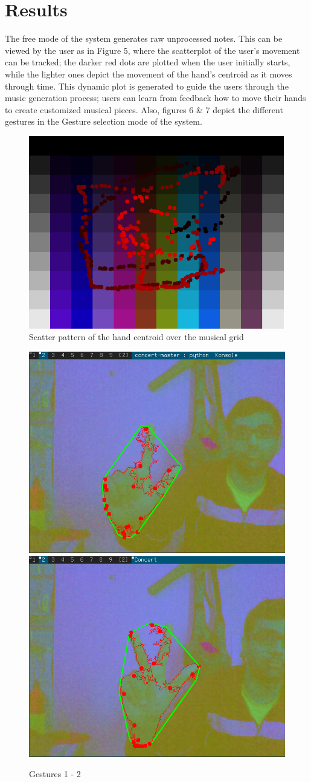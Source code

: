 \documentclass[letterpaper, 10 pt, twoside, conference]{ieeeconf}
\begin{document}
\section{Results}

The free mode of the system generates raw unprocessed notes. This can be viewed by the user as in Figure 5,
where the scatterplot of the user's movement can be tracked; the darker red dots are plotted when the
user initially starts, while the lighter ones depict the movement of the hand's centroid as it moves
through time. This dynamic plot is generated to guide the users through the music generation process;
users can learn from feedback how to move their hands to create customized musical pieces. Also, figures
6 \& 7 depict the different gestures in the Gesture selection mode of the system.

\begin{figure}[h!]
  \centering
  \includegraphics[width=0.8\columnwidth]{scatter.png}
  \caption{Scatter pattern of the hand centroid over the musical grid}
  \label{scatter}
\end{figure}

\begin{figure}[h!]
  \centering
  \includegraphics[width=0.4\columnwidth]{ges1.png}
  \includegraphics[width=0.4\columnwidth]{ges2.png}
  \caption{Gestures 1 - 2}
  \label{Overall1}
\end{figure}
\end{document}
